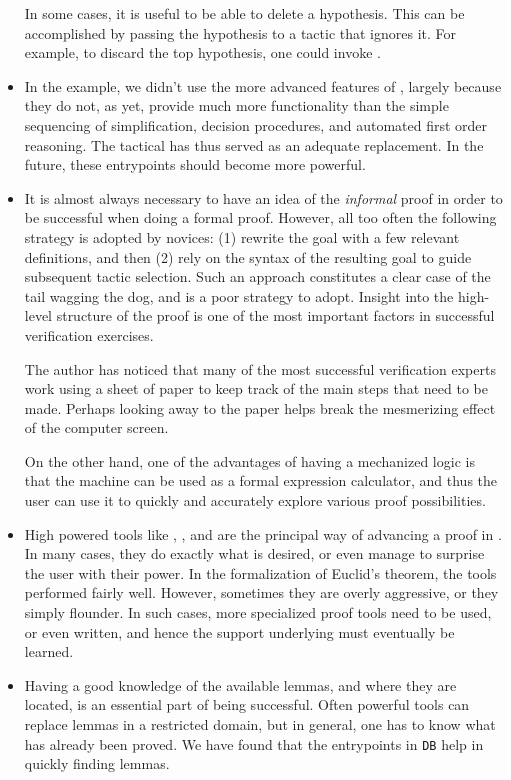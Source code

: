 \begin{itemize}
In some cases, it is useful to be able to delete a hypothesis. This can
be accomplished by passing the hypothesis to a tactic that ignores
it. For example, to discard the top hypothesis, one could invoke
.

\item In the example, we didn't use the more advanced features of
, largely because they do not, as yet, provide much more
functionality than the simple sequencing of simplification, decision
procedures, and automated first order reasoning. The 
tactical has thus served as an adequate replacement. In the future,
these entrypoints should become more powerful.

\item It is almost always necessary to have an idea of the {\it
    informal\/} proof in order to be successful when doing a formal
  proof. However, all too often the following strategy is adopted by
  novices: (1) rewrite the goal with a few relevant definitions, and
  then (2) rely on the syntax of the resulting goal to guide
  subsequent tactic selection. Such an approach constitutes a clear
  case of the tail wagging the dog, and is a poor strategy to adopt.
  Insight into the high-level structure of the proof is one of the
  most important factors in successful verification exercises.

The author has noticed that many of the most successful verification
experts work using a sheet of paper to keep track of the main steps that
need to be made. Perhaps looking away to the paper helps break the
mesmerizing effect of the computer screen.

On the other hand, one of the advantages of having a mechanized logic
is that the machine can be used as a formal expression calculator,
and thus the user can use it to quickly and accurately explore various
proof possibilities.
\item High powered tools like , , and
 are the principal way of advancing a proof in
. In many cases, they do exactly what is desired, or even
manage to surprise the user with their power. In the formalization of
Euclid's theorem, the tools performed fairly well. However, sometimes
they are overly aggressive, or they simply flounder. In such cases, more
specialized proof tools need to be used, or even written, and hence the
support underlying  must eventually be learned.

\item Having a good knowledge of the available lemmas, and where they
are located, is an essential part of being successful. Often powerful
tools can replace lemmas in a restricted domain, but in general, one has
to know what has already been proved. We have found that the entrypoints
in \verb+DB+ help in quickly finding lemmas.

\end{itemize}



